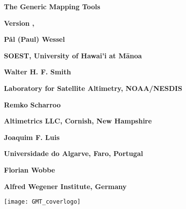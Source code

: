%
%

\thispagestyle{empty}

\begin{center}
\Huge
\textbf{The Generic Mapping Tools}\par
\vspace{0.5\baselineskip}
\huge
\textbf{\GMTTITLE}\par

\large
\vspace{0.5\baselineskip}
\textbf{Version \GMTDOCVERSION, \GMTDOCDATE}\par
\vspace{2.0\baselineskip}

\huge
\textbf{P\aa l (Paul) Wessel}\par
\vspace{0.2\baselineskip}
\Large
\textbf{SOEST, University of Hawai'i at M\={a}noa}\par
\vspace{0.3\baselineskip}

\huge
\textbf{Walter H. F. Smith}\par
\vspace{0.2\baselineskip}
\Large
\textbf{Laboratory for Satellite Altimetry, NOAA/NESDIS}\par
\vspace{0.3\baselineskip}

\huge
\textbf{Remko Scharroo}\par
\vspace{0.2\baselineskip}
\Large
\textbf{Altimetrics LLC, Cornish, New Hampshire}\par
\vspace{0.3\baselineskip}

\huge
\textbf{Joaquim F. Luis}\par
\vspace{0.2\baselineskip}
\Large
\textbf{Universidade do Algarve, Faro, Portugal}\par
\vspace{0.3\baselineskip}

\huge
\textbf{Florian Wobbe}\par
\vspace{0.2\baselineskip}
\Large
\textbf{Alfred Wegener Institute, Germany}\par
\vspace{2.0\baselineskip}

\texttt{[image: GMT\_coverlogo]}
\end{center}
